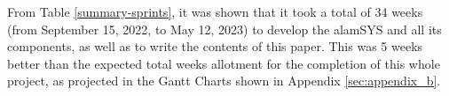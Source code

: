 From Table \ref{summary-sprints}, it was
shown that it took a total of 34 weeks (from September 15, 2022, 
to May 12, 2023) to develop the alamSYS and all its components, as
well as to write the contents of this paper. This was 5 weeks
better than the expected total weeks allotment for the completion
of this whole project, as projected in the Gantt Charts shown in
Appendix \ref{sec:appendix_b}.